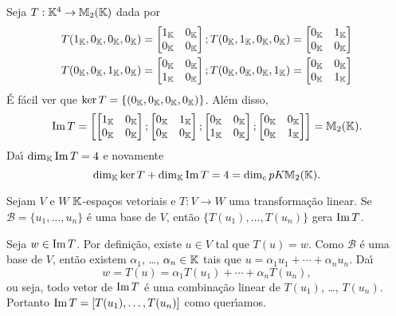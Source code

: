 \begin{exemplo}
	Seja $T : \mathbb{K}^4 \to \mathbb{M}_2(\mathbb{K})$ dada por
	\begin{align*}
		T(1_{\mathbb{K}},0_{\mathbb{K}},0_{\mathbb{K}},0_{\mathbb{K}}) &= \begin{bmatrix}
			1_{\mathbb{K}} & 0_{\mathbb{K}}\\
			0_{\mathbb{K}} & 0_{\mathbb{K}}
		\end{bmatrix}; T(0_{\mathbb{K}},1_{\mathbb{K}},0_{\mathbb{K}},0_{\mathbb{K}}) = \begin{bmatrix}
			0_{\mathbb{K}} & 1_{\mathbb{K}}\\
			0_{\mathbb{K}} & 0_{\mathbb{K}}
		\end{bmatrix}\\
		T(0_{\mathbb{K}},0_{\mathbb{K}},1_{\mathbb{K}},0_{\mathbb{K}}) &= \begin{bmatrix}
			0_{\mathbb{K}} & 0_{\mathbb{K}}\\
			1_{\mathbb{K}} & 0_{\mathbb{K}}
		\end{bmatrix}; T(0_{\mathbb{K}},0_{\mathbb{K}},0_{\mathbb{K}},1_{\mathbb{K}}) = \begin{bmatrix}
			0_{\mathbb{K}} & 0_{\mathbb{K}}\\
			0_{\mathbb{K}} & 1_{\mathbb{K}}
		\end{bmatrix}\\
	\end{align*}
	\'E f\'acil ver que $\ker T = \{(0_{\mathbb{K}},0_{\mathbb{K}},0_{\mathbb{K}},0_{\mathbb{K}})\}$. Al\'em disso,
	\[
		{\rm Im\,} T = \left[\begin{bmatrix}
			1_{\mathbb{K}} & 0_{\mathbb{K}}\\
			0_{\mathbb{K}} & 0_{\mathbb{K}}
		\end{bmatrix};\begin{bmatrix}
			0_{\mathbb{K}} & 1_{\mathbb{K}}\\
			0_{\mathbb{K}} & 0_{\mathbb{K}}
		\end{bmatrix};\begin{bmatrix}
			0_{\mathbb{K}} & 0_{\mathbb{K}}\\
			1_{\mathbb{K}} & 0_{\mathbb{K}}
		\end{bmatrix};\begin{bmatrix}
			0_{\mathbb{K}} & 0_{\mathbb{K}}\\
			0_{\mathbb{K}} & 1_{\mathbb{K}}
		\end{bmatrix}\right] = \mathbb{M}_2(\mathbb{K}).
	\]
	Da{\'\i} $\dim_{\mathbb{K}}{\rm Im\,} T = 4$ e novamente
	\[
		\dim_{\mathbb{K}}\ker T + \dim_{\mathbb{K}}{\rm Im\,} T = 4 = \dim_cp{K}\mathbb{M}_2(\mathbb{K}).
	\]
\end{exemplo}

\begin{lema}\label{transformacao_gera_imagem}
	Sejam $V$ e $W$ $\mathbb{K}$-espa\c{c}os vetoriais e $T : V \to W$ uma transforma\c{c}\~ao linear. Se $\mathcal{B} = \{u_1, \dots, u_n\}$ \'e uma base de $V$, ent\~ao $\{T(u_1), \dots, T(u_n)\}$ gera ${\rm Im\,} T$.
\end{lema}
\begin{prova}
	Seja $w \in {\rm Im\,} T$. Por defini\c{c}\~ao, existe $u \in V$ tal que $T(u) = w$. Como $\mathcal{B}$ \'e uma base de $V$, ent\~ao existem $\alpha_1$, \dots, $\alpha_n \in \mathbb{K}$ tais que $u = \alpha_1u_1 + \cdots + \alpha_nu_n$. Da{\'\i}
	\[
		w = T(u) = \alpha_1T(u_1) + \cdots + \alpha_nT(u_n),
	\]
	ou seja, todo vetor de ${\rm Im\,} T$ \'e uma combina\c{c}\~ao linear de $T(u_1)$, \dots, $T(u_n)$. Portanto ${\rm Im\,} T = [T(u_1), \dots, T(u_n)]$ como quer{\'\i}amos.
\end{prova}

